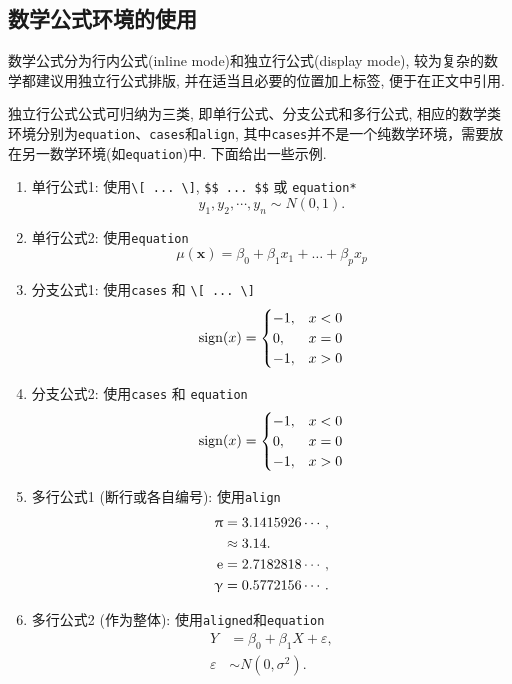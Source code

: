 \documentclass[Chinese]{APSart}
\begin{document}
\subsection{数学公式环境的使用}

数学公式分为行内公式(inline mode)和独立行公式(display mode), 较为复杂的数学都建议用独立行公式排版, 并在适当且必要的位置加上标签, 便于在正文中引用. 

独立行公式公式可归纳为三类, 即单行公式、分支公式和多行公式, 相应的数学类环境分别为\texttt{equation}、\texttt{cases}和\texttt{align}, 其中\texttt{cases}并不是一个纯数学环境，需要放在另一数学环境(如\texttt{equation})中. 下面给出一些示例. 
\begin{enumerate}[leftmargin=7.8mm,itemsep=-0.1ex]
\item 单行公式1: 使用\verb/\[ ... \]/, \verb/$$ ... $$/ 或  \texttt{equation*}
\[
y_1, y_2, \cdots, y_n \sim N(0,1).
\]
\item 单行公式2: 使用\texttt{equation}
\begin{equation}\label{eqn-1}
\mu(\bm x)=\beta_0 + \beta_1 x_1 + \dots + \beta_p x_p
\end{equation}	
\item 分支公式1: 使用\texttt{cases} 和 \verb/\[ ... \]/
\[ 
\operatorname{\mathrm{sign}}(x)=
\begin{cases}
	-1, & \text{$x<0$}\\
	0, & \text{$x=0$}\\
	-1, & \text{$x>0$}
\end{cases} 
\]
\item 分支公式2: 使用\texttt{cases} 和 \texttt{equation}
\begin{equation}\label{eqn-2}
\operatorname{\mathrm{sign}}(x)=
\begin{cases}
	-1, & \text{$x<0$}\\
	0,  & \text{$x=0$}\\
	-1, & \text{$x>0$}
\end{cases} 
\end{equation}
\item 多行公式1 (断行或各自编号): 使用\texttt{align}	
\begin{align}
	\uppi &= 3.1415926\cdots, \nonumber \\
	&\approx  3.14. \label{align-a1}\\
	\mathrm{e} &= 2.7182818\cdots, \label{align-a2}\\
	\upgamma &= 0.5772156\cdots .   \label{align-a3}
\end{align}
\item 多行公式2 (作为整体): 使用\texttt{aligned}和\texttt{equation}	
\begin{equation}\label{align-2}
\begin{aligned}
Y & = \beta_0 + \beta_1 X + \varepsilon, \\
\varepsilon & \sim N(0, \sigma^2). 
\end{aligned}
\end{equation}
\end{enumerate}
\end{document}
